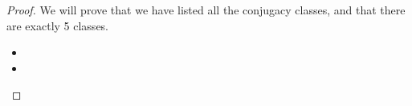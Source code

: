 \documentclass[12pt, psamsfonts]{amsart}
\theoremstyle{definition}
\theoremstyle{remark}
\numberwithin{equation}{section}
\begin{document}
\begin{proof}
  We will prove that we have listed all the conjugacy classes, and that there are exactly 5 classes.
  \begin{itemize}
    \item
    \item
  \end{itemize}
\end{proof}
\end{document}
